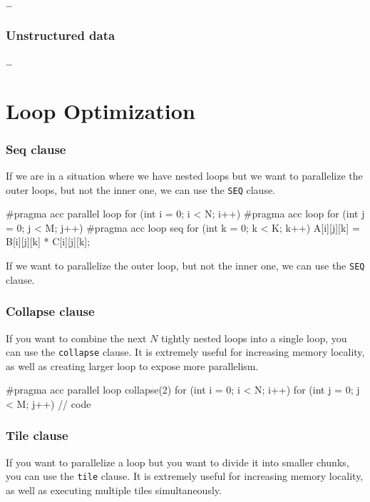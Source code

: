 \dots

\subsubsection{Unstructured data}

\dots

\section{Loop Optimization}

\subsubsection{Seq clause}

If we are in a situation where we have nested loops but we want to parallelize the outer loops, but not the inner one, we can use the \texttt{SEQ} clause.

\begin{codeblock}[language=C]
#pragma acc parallel loop
for (int i = 0; i < N; i++) {
    #pragma acc loop
    for (int j = 0; j < M; j++) {
        #pragma acc loop seq
        for (int k = 0; k < K; k++) {
            A[i][j][k] = B[i][j][k] * C[i][j][k];
        }
    }
}
\end{codeblock}

If we want to parallelize the outer loop, but not the inner one, we can use the \texttt{SEQ} clause.

\subsubsection{Collapse clause}

If you want to combine the next $N$ tightly nested loops into a single loop, you can use the \texttt{collapse} clause. It is extremely useful for increasing memory locality, as well as creating larger loop to expose more parallelism.

\begin{codeblock}[language=C]
#pragma acc parallel loop collapse(2)
for (int i = 0; i < N; i++) {
    for (int j = 0; j < M; j++) {
        // code
    }
}
\end{codeblock}

\subsubsection{Tile clause}

If you want to parallelize a loop but you want to divide it into smaller chunks, you can use the \texttt{tile} clause. It is extremely useful for increasing memory locality, as well as executing multiple tiles simultaneously.

